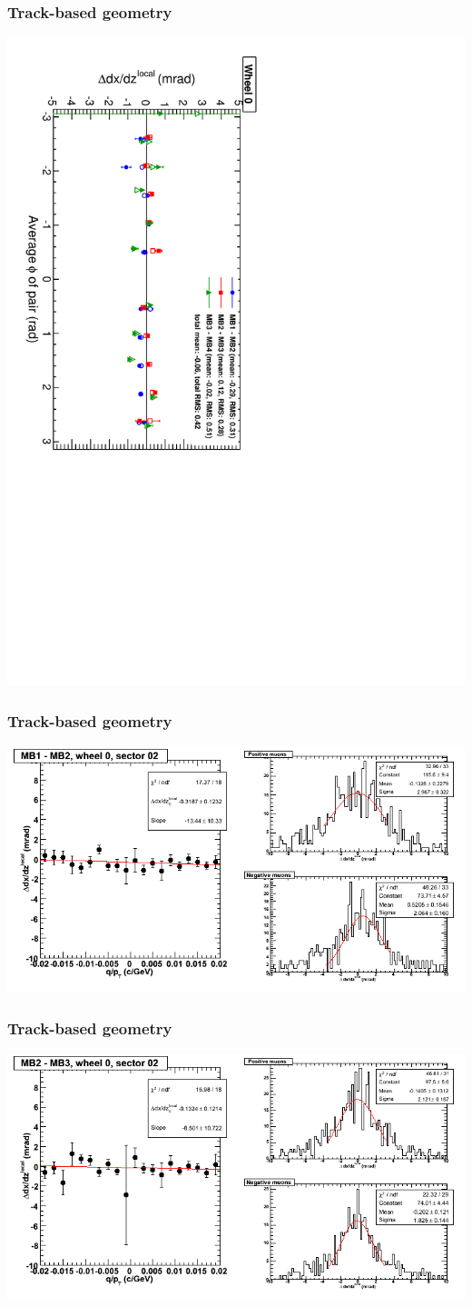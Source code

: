 \documentclass[compress]{beamer}
\begin{document}
\begin{frame}
\frametitle{Track-based geometry}
\includegraphics[height=\linewidth, angle=90]{NOV4_segdiff_dxdz_whze.pdf}
\end{frame}

\begin{frame}
\frametitle{Track-based geometry}
\includegraphics[width=\linewidth]{NOV4_segdiffs/dt13_slope_C_02_12.png}
\end{frame}

\begin{frame}
\frametitle{Track-based geometry}
\includegraphics[width=\linewidth]{NOV4_segdiffs/dt13_slope_C_02_23.png}
\end{frame}
\end{document}
